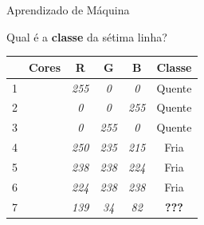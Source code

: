  \begin{frame}[fragile]{Aprendizado de Máquina}

    \centering
    Qual é a \textbf{classe} da sétima linha?

    \begin{table}[]
    \centering
    \begin{tabular}{l|c|c|c|c|c|}
    \cline{2-6}
                            & \textbf{Cores}           & \textbf{R}   & \textbf{G}   & \textbf{B}   & \textbf{Classe} \\ \hline
    \multicolumn{1}{|l|}{1} & \cellcolor[HTML]{FF0000} & \textit{255} & \textit{0}   & \textit{0}   & Quente          \\ \hline
    \multicolumn{1}{|l|}{2} & \cellcolor[HTML]{0000FF} & \textit{0}   & \textit{0}   & \textit{255} & Quente          \\ \hline
    \multicolumn{1}{|l|}{3} & \cellcolor[HTML]{00FF00} & \textit{0}   & \textit{255} & \textit{0}   & Quente          \\ \hline
    \multicolumn{1}{|l|}{4} & \cellcolor[HTML]{FAEBD7} & \textit{250} & \textit{235} & \textit{215} & Fria            \\ \hline
    \multicolumn{1}{|l|}{5} & \cellcolor[HTML]{EEEEE0} & \textit{238} & \textit{238} & \textit{224} & Fria            \\ \hline
    \multicolumn{1}{|l|}{6} & \cellcolor[HTML]{E0EEEE} & \textit{224} & \textit{238} & \textit{238} & Fria            \\ \hline
    \multicolumn{1}{|l|}{7} & \cellcolor[HTML]{8B2252} & \textit{139} & \textit{34}  & \textit{82}  & \textbf{???}               \\ \hline
    \end{tabular}
    \label{my-label}
    \end{table}
  \end{frame}

